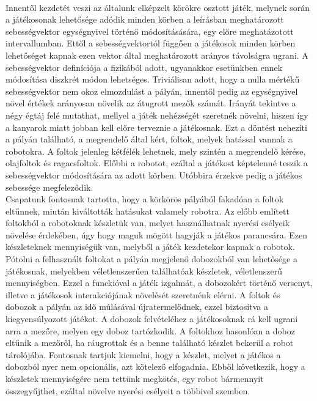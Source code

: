 {\\
Innentől kezdetét veszi az általunk elképzelt körökre osztott játék, melynek során a játékosonak lehetősége adódik minden körben a leírásban meghatározott sebességvektor egységnyivel történő módosításására, egy előre meghatázotott intervallumban. Ettől a sebességvektortól függően a játékosok minden körben lehetőséget kapnak ezen vektor által meghatározott arányos távolságra ugrani. A sebességvektor definíciója a fizikából adott, ugyanakkor esetünkben ennek módosítása diszkrét módon lehetséges. Triviálisan adott, hogy a nulla mértékű sebességvektor nem okoz elmozdulást a pályán, innentől pedig az egységnyivel növel értékek arányosan növelik az átugrott mezők számát. Irányát tekintve a négy égtáj felé mutathat, mellyel a játék nehézségét szeretnék növelni, hiszen így a kanyarok miatt jobban kell előre terveznie a játékosnak. Ezt a döntést nehezíti a pályán található, a megrendelő által kért, foltok, melyek hatással vannak a robotokra. A foltok jelenleg kétfélék lehetnek, mely szintén a megrendelő kérése, olajfoltok és ragacsfoltok. Előbbi a robotot, ezáltal a játékost képtelenné teszik a sebességvektor módosítására az adott körben. Utóbbira érzekve pedig a játékos sebessége megfeleződik. 
\\
Csapatunk fontosnak tartotta, hogy a körkörös pályából fakadóan a foltok eltűnnek, miután kiváltották hatásukat valamely robotra. Az előbb említett foltokból a robotoknak készletük van, melyet használhatnak nyerési esélyeik növelése érdekében, úgy hogy maguk mögött hagyják a játékos parancsára. Ezen készleteknek mennyiségük van, melyből a játék kezdetekor kapnak a robotok. Pótolni a felhasznált foltokat a pályán megjelenő dobozokból van lehetősége a játékosnak, melyekben véletlenszerűen találhatóak készletek, véletlenszerű mennyiségben. Ezzel a funckióval a játék izgalmát, a dobozokért történő versenyt, illetve a játékosok interakciójának növelését szeretnénk elérni. A foltok és dobozok a pályán az idő múlásával újratermelődnek, ezzel biztosítva a kiegyensúlyozott játékot. A dobozok felvételéhez a játékosoknak rá kell ugrani arra a mezőre, melyen egy doboz tartózkodik. A foltokhoz hasonlóan a doboz eltűnik a mezőről, ha ráugrottak és a benne található készlet bekerül a robot tárolójába. Fontosnak tartjuk kiemelni, hogy a készlet, melyet a játékos a dobozból nyer nem opcionális, azt kötelező elfogadnia. Ebből következik, hogy a készletek mennyiségére nem tettünk megkötés, egy robot bármennyit összegyűjthet, ezáltal növelve nyerési esélyeit a többivel szemben.
\\
}
